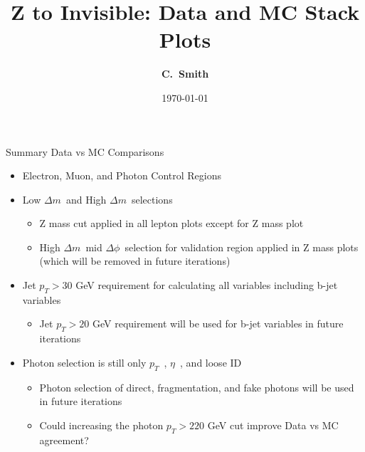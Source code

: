 \documentclass[10pt,xcolor=svgnames,fleqn,aspectratio=169]{beamer}
\title{Z to Invisible: Data and MC Stack Plots}
\author{\textcolor{DodgerBlueDark}{\bf C.~Smith\inst{1}}}
\institute{\inst{1} Baylor}
\date{\today}
\newcommand{\dm}{$\Delta m$~}
\newcommand{\dphi}{$\Delta \phi$~}
\newcommand{\pt}{$p_{T}$~}
\newcommand{\texeta}{$\eta$~}
\begin{document}
\begin{frame}[plain]
\maketitle
\end{frame}

\begin{frame}{Summary}
Data vs MC Comparisons
\begin{itemize}
\item Electron, Muon, and Photon Control Regions
\item Low \dm and High \dm selections
\begin{itemize}
\item Z mass cut applied in all lepton plots except for Z mass plot
\item High \dm mid \dphi selection for validation region applied in Z mass plots (which will be removed in future iterations)
\end{itemize}
\item Jet $p_T > 30$ GeV requirement for calculating all variables including b-jet variables
\begin{itemize}
\item Jet $p_T > 20$ GeV requirement will be used for b-jet variables in future iterations
\end{itemize}
\item Photon selection is still only \pt, \texeta, and loose ID
\begin{itemize}
\item Photon selection of direct, fragmentation, and fake photons will be used in future iterations
\item Could increasing the photon $p_{T} > 220$ GeV cut improve Data vs MC agreement?
\end{itemize}
\end{itemize}
\end{frame}




\end{document}
